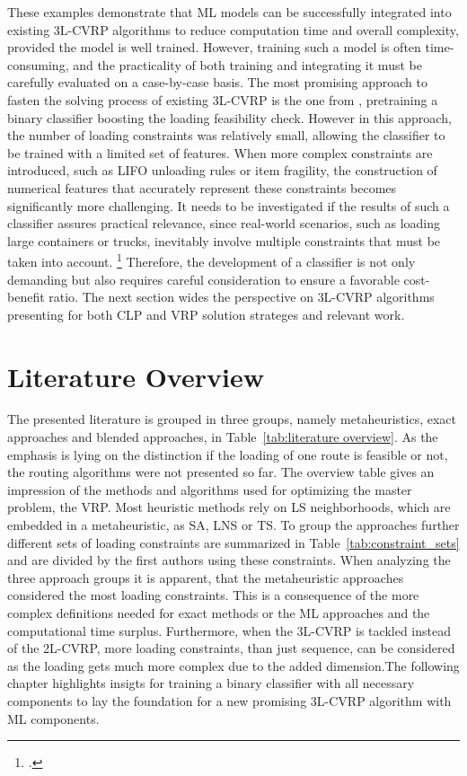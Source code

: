 \parbreak

These examples demonstrate that \gls{ML} models can be successfully integrated into existing \gls{3L-CVRP}
algorithms to reduce computation time and overall complexity, provided the model is well trained.
However, training such a model is often time-consuming, and the practicality of both training and
integrating it must be carefully evaluated on a case-by-case basis. The most promising approach to
fasten the solving process of existing \gls{3L-CVRP} is the one from \cite{zhang_learning-based_2022},
pretraining a binary classifier boosting the loading feasibility check. However in this approach,
the number of loading constraints was relatively small, allowing the classifier
to be trained with a limited set of features. When more complex constraints are introduced, such as
\gls{LIFO} unloading rules or item fragility, the construction of numerical features that accurately
represent these constraints becomes significantly more challenging. It needs to be investigated if
the results of such a classifier assures practical relevance, since real-world
scenarios, such as loading large containers or trucks, inevitably involve multiple constraints that
must be taken into account. \footcite[cf.][pp. 1--2]{bischoff_issues_1995}
Therefore, the development of a classifier is not only demanding but also
requires careful consideration to ensure a favorable cost-benefit ratio. The next section wides the perspective
on \gls{3L-CVRP} algorithms presenting for both \gls{CLP} and \gls{VRP} solution strateges and relevant work.

\section{Literature Overview}
\label{sec:literature_overview}

The presented literature is grouped in three groups, namely metaheuristics, exact approaches and blended
approaches, in Table~\ref{tab:literature overview}. As the emphasis is lying on the distinction
if the loading of one route is feasible or not, the routing algorithms were not presented so far.
The overview table gives an impression of the methods and algorithms used for
optimizing the master problem, the \gls{VRP}. Most heuristic methods rely on \gls{LS} neighborhoods,
which are embedded in a metaheuristic, as \gls{SA}, \gls{LNS} or \gls{TS}. To group the approaches
further different sets of loading constraints are summarized in Table~\ref{tab:constraint_sets} and
are divided by the first authors using these constraints.
When analyzing the three approach groups it is apparent, that the metaheuristic approaches considered
the most loading constraints. This is a consequence of the more complex definitions needed for
exact methods or the \gls{ML} approaches and the computational time surplus. Furthermore, when
the \gls{3L-CVRP} is tackled instead of the \gls{2L-CVRP}, more loading constraints, than just sequence,
can be considered as the loading gets much more complex due to the added dimension.The following chapter
highlights insigts for training a binary classifier with all necessary components
to lay the foundation for a new promising \gls{3L-CVRP} algorithm with \gls{ML} components.

